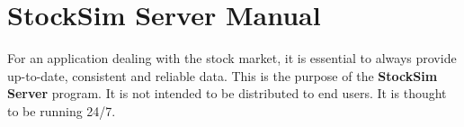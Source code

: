 \chapter{StockSim Server Manual}
For an application dealing with the stock market, it is essential to 
always provide up-to-date, consistent and reliable data. This is the purpose of 
the \textbf{StockSim Server} program. It is not intended to be distributed to 
end users. It is thought to be running 24/7.
